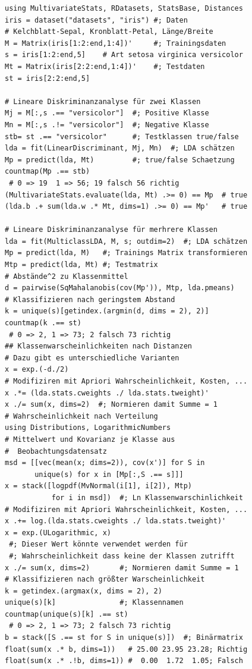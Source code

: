 \documentclass[10pt,twocolumn]{scrartcl}
\begin{document}
\begin{lstlisting}
using MultivariateStats, RDatasets, StatsBase, Distances
iris = dataset("datasets", "iris") #; Daten
# Kelchblatt-Sepal, Kronblatt-Petal, Länge/Breite
M = Matrix(iris[1:2:end,1:4])'     #; Trainingsdaten
s = iris[1:2:end,5]    # Art setosa virginica versicolor
Mt = Matrix(iris[2:2:end,1:4])'    #; Testdaten
st = iris[2:2:end,5]

# Lineare Diskriminanzanalyse für zwei Klassen
Mj = M[:,s .== "versicolor"]  #; Positive Klasse
Mn = M[:,s .!= "versicolor"]  #; Negative Klasse
stb= st .== "versicolor"      #; Testklassen true/false
lda = fit(LinearDiscriminant, Mj, Mn)  #; LDA schätzen
Mp = predict(lda, Mt)         #; true/false Schaetzung
countmap(Mp .== stb)
 # 0 => 19  1 => 56; 19 falsch 56 richtig
(MultivariateStats.evaluate(lda, Mt) .>= 0) == Mp  # true
(lda.b .+ sum(lda.w .* Mt, dims=1) .>= 0) == Mp'   # true

# Lineare Diskriminanzanalyse für merhrere Klassen
lda = fit(MulticlassLDA, M, s; outdim=2)  #; LDA schätzen
Mp = predict(lda, M)   #; Trainings Matrix transformieren
Mtp = predict(lda, Mt) #; Testmatrix
# Abstände^2 zu Klassenmittel
d = pairwise(SqMahalanobis(cov(Mp')), Mtp, lda.pmeans)
# Klassifizieren nach geringstem Abstand
k = unique(s)[getindex.(argmin(d, dims = 2), 2)]
countmap(k .== st)
 # 0 => 2, 1 => 73; 2 falsch 73 richtig
## Klassenwarscheinlichkeiten nach Distanzen
# Dazu gibt es unterschiedliche Varianten
x = exp.(-d./2)
# Modifiziren mit Apriori Wahrscheinlichkeit, Kosten, ...
x .*= (lda.stats.cweights ./ lda.stats.tweight)'
x ./= sum(x, dims=2)  #; Normieren damit Summe = 1
# Wahrscheinlichkeit nach Verteilung
using Distributions, LogarithmicNumbers
# Mittelwert und Kovarianz je Klasse aus
#  Beobachtungsdatensatz
msd = [[vec(mean(x; dims=2)), cov(x')] for S in
       unique(s) for x in [Mp[:,S .== s]]]
x = stack([logpdf(MvNormal(i[1], i[2]), Mtp)
           for i in msd])  #; Ln Klassenwarschinlichkeit
# Modifiziren mit Apriori Wahrscheinlichkeit, Kosten, ...
x .+= log.(lda.stats.cweights ./ lda.stats.tweight)'
x = exp.(ULogarithmic, x)
 #; Dieser Wert könnte verwendet werden für
 #; Wahrscheinlichkeit dass keine der Klassen zutrifft
x ./= sum(x, dims=2)       #; Normieren damit Summe = 1
# Klassifizieren nach größter Warscheinlichkeit
k = getindex.(argmax(x, dims = 2), 2)
unique(s)[k]               #; Klassennamen
countmap(unique(s)[k] .== st)
 # 0 => 2, 1 => 73; 2 falsch 73 richtig
b = stack([S .== st for S in unique(s)])  #; Binärmatrix
float(sum(x .* b, dims=1))   # 25.00 23.95 23.28; Richtig
float(sum(x .* .!b, dims=1)) #  0.00  1.72  1.05; Falsch


\end{lstlisting}
\end{document}
